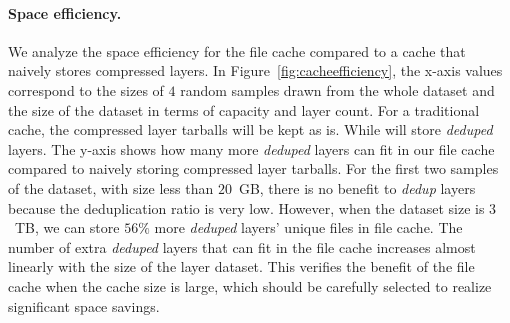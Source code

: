 \vspace{-6pt}
\paragraph{Space efficiency.}
We analyze the space efficiency for the file cache compared to a cache that naively stores
compressed layers.
%
%
In Figure~\ref{fig:cacheefficiency}, the x-axis values correspond to the sizes of $4$ random samples drawn from the whole dataset and the size of the dataset in terms of capacity and layer count.
For a traditional cache, the compressed layer tarballs will be kept as is.
While \sysname will store \emph{deduped} layers. 
The y-axis shows how many more \emph{deduped} layers can fit in our file cache compared to naively storing compressed layer tarballs.
For the first two samples of the dataset, with size less than $20$~GB, 
there is no benefit to \emph{dedup} layers 
because the deduplication ratio is very low.
However, when the dataset size is $3$~TB, we can store $56\%$ more \emph{deduped} layers' unique files in file cache.
The number of extra \emph{deduped} layers that can fit in the file cache increases almost linearly with the size of the layer dataset.
This verifies the benefit of the file cache when the cache size is large, which should be carefully selected to realize significant space savings.





